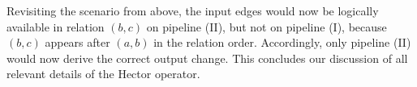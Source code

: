 \documentclass[../index.tex]{subfiles}
\begin{document}
Revisiting the scenario from above, the input edges would now be
logically available in relation $(b,c)$ on pipeline (II), but not on
pipeline (I), because $(b,c)$ appears after $(a,b)$ in the relation
order. Accordingly, only pipeline (II) would now derive the correct
output change. This concludes our discussion of all relevant details
of the Hector operator.
\end{document}
